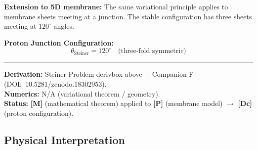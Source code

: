 \documentclass[11pt,a4paper]{article}
\newcommand{\tagP}{\textcolor{red!70!black}{\textbf{[P]}}}
\newcommand{\tagDc}{\textcolor{blue!70!black}{\textbf{[Dc]}}}
\newcommand{\tagM}{\textcolor{black}{\textbf{[M]}}}
\begin{document}

\textbf{Extension to 5D membrane:} The same variational principle applies to membrane sheets meeting at a junction. The stable configuration has three sheets meeting at $120^\circ$ angles.

\begin{resultbox}
\textbf{Proton Junction Configuration:}
\begin{equation}
    \theta_{\text{Steiner}} = 120^\circ \quad \text{(three-fold symmetric)}
    \label{eq:steiner_angle}
\end{equation}

\vspace{0.3em}\hrule\vspace{0.3em}
\textbf{Derivation:} Steiner Problem derivbox above + Companion F (DOI:~10.5281/zenodo.18302953).\\
\textbf{Numerics:} N/A (variational theorem / geometry).\\
\textbf{Status:} \tagM{} (mathematical theorem) applied to \tagP{} (membrane model) $\to$ \tagDc{} (proton configuration).
\end{resultbox}

\subsection{Physical Interpretation}
\end{document}
